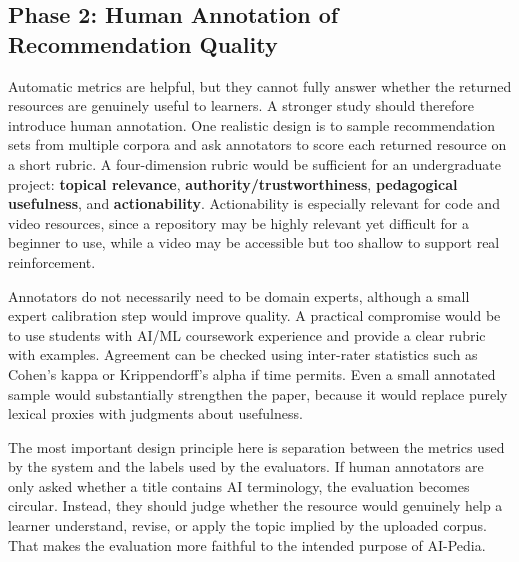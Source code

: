 \documentclass[10pt,journal,compsoc]{IEEEtran}
\begin{document}
\subsection{Phase 2: Human Annotation of Recommendation Quality}

Automatic metrics are helpful, but they cannot fully answer whether the returned resources are genuinely useful to learners. A stronger study should therefore introduce human annotation. One realistic design is to sample recommendation sets from multiple corpora and ask annotators to score each returned resource on a short rubric. A four-dimension rubric would be sufficient for an undergraduate project: \textbf{topical relevance}, \textbf{authority/trustworthiness}, \textbf{pedagogical usefulness}, and \textbf{actionability}. Actionability is especially relevant for code and video resources, since a repository may be highly relevant yet difficult for a beginner to use, while a video may be accessible but too shallow to support real reinforcement.

Annotators do not necessarily need to be domain experts, although a small expert calibration step would improve quality. A practical compromise would be to use students with AI/ML coursework experience and provide a clear rubric with examples. Agreement can be checked using inter-rater statistics such as Cohen's kappa or Krippendorff's alpha if time permits. Even a small annotated sample would substantially strengthen the paper, because it would replace purely lexical proxies with judgments about usefulness.

The most important design principle here is separation between the metrics used by the system and the labels used by the evaluators. If human annotators are only asked whether a title contains AI terminology, the evaluation becomes circular. Instead, they should judge whether the resource would genuinely help a learner understand, revise, or apply the topic implied by the uploaded corpus. That makes the evaluation more faithful to the intended purpose of AI-Pedia.
\end{document}
